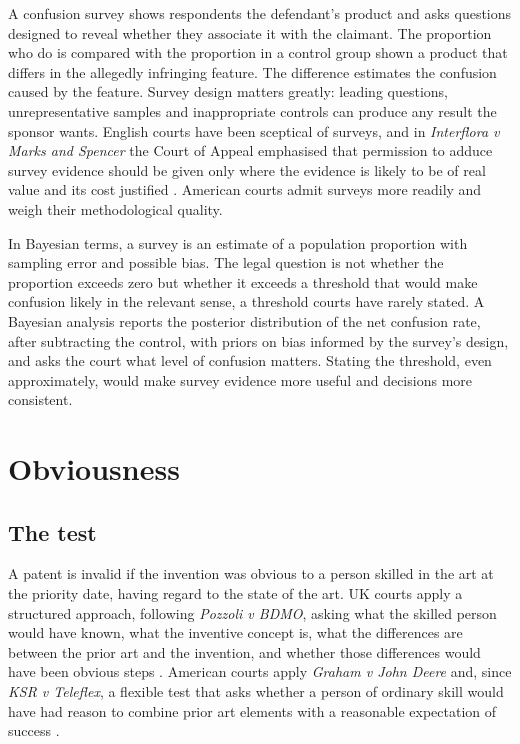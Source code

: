 A confusion survey shows respondents the defendant's product and asks questions designed to reveal whether they associate it with the claimant. The proportion who do is compared with the proportion in a control group shown a product that differs in the allegedly infringing feature. The difference estimates the confusion caused by the feature. Survey design matters greatly: leading questions, unrepresentative samples and inappropriate controls can produce any result the sponsor wants. English courts have been sceptical of surveys, and in \emph{Interflora v Marks and Spencer} the Court of Appeal emphasised that permission to adduce survey evidence should be given only where the evidence is likely to be of real value and its cost justified \citep{interflora2012,interflora2013}. American courts admit surveys more readily and weigh their methodological quality.

In Bayesian terms, a survey is an estimate of a population proportion with sampling error and possible bias. The legal question is not whether the proportion exceeds zero but whether it exceeds a threshold that would make confusion likely in the relevant sense, a threshold courts have rarely stated. A Bayesian analysis reports the posterior distribution of the net confusion rate, after subtracting the control, with priors on bias informed by the survey's design, and asks the court what level of confusion matters. Stating the threshold, even approximately, would make survey evidence more useful and decisions more consistent.

\section{Obviousness}

\subsection{The test}

A patent is invalid if the invention was obvious to a person skilled in the art at the priority date, having regard to the state of the art. UK courts apply a structured approach, following \emph{Pozzoli v BDMO}, asking what the skilled person would have known, what the inventive concept is, what the differences are between the prior art and the invention, and whether those differences would have been obvious steps \citep{pozzoli2007}. American courts apply \emph{Graham v John Deere} and, since \emph{KSR v Teleflex}, a flexible test that asks whether a person of ordinary skill would have had reason to combine prior art elements with a reasonable expectation of success \citep{ksr2007}.

